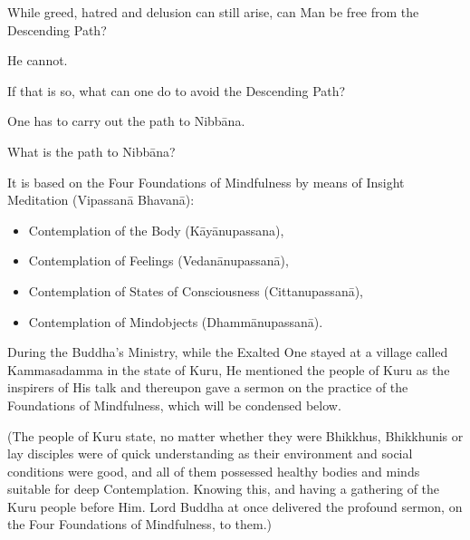 \documentclass[a5paper,10pt,english]{book}
\begin{document}
\sphinxAtStartPar
{} While greed, hatred and delusion can still arise, can Man be free from the Descending Path?

\sphinxAtStartPar
{} He cannot.

\sphinxAtStartPar
{} If that is so, what can one do to avoid the Descending Path?

\sphinxAtStartPar
{} One has to carry out the path to Nibbāna.

\sphinxAtStartPar
{} What is the path to Nibbāna?

\sphinxAtStartPar
{} It is based on the Four Foundations of Mindfulness by means of Insight Meditation (Vipassanā Bhavanā):
\begin{itemize}
\item {} 
\sphinxAtStartPar
Contemplation of the Body (Kāyānupassana),

\item {} 
\sphinxAtStartPar
Contemplation of Feelings (Vedanānupassanā),

\item {} 
\sphinxAtStartPar
Contemplation  of   States   of   Consciousness (Cittanupassanā),

\item {} 
\sphinxAtStartPar
Contemplation of Mind\sphinxhyphen{}objects (Dhammānupassanā).

\end{itemize}

\sphinxAtStartPar
During the Buddha’s Ministry, while the Exalted One stayed at a village called Kammasadamma in the state of Kuru, He mentioned the people of Kuru as the inspirers of His talk and thereupon gave a sermon on the practice of the Foundations of Mindfulness, which will be condensed below.

\sphinxAtStartPar
(The people of Kuru state, no matter whether they were Bhikkhus, Bhikkhunis or lay disciples were of quick understanding as their environment and social conditions were good, and all of them possessed healthy bodies and minds suitable for deep Contemplation. Knowing this, and having a gathering of the Kuru people before Him. Lord Buddha at once delivered the profound sermon, on the Four Foundations of Mindfulness, to them.)
\end{document}
